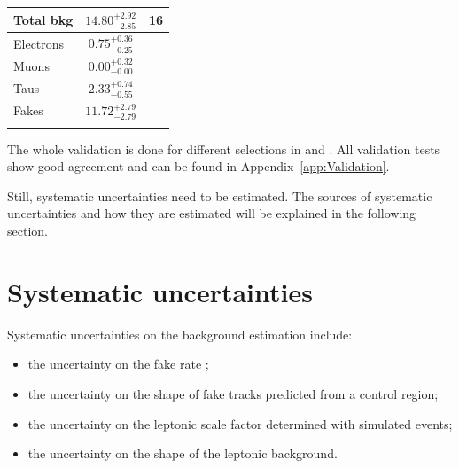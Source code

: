 \begin{table}[!b]
{\begin{tabular}{l|c |c}
\midrule
Total bkg                                                      &       $14.80^{ + 2.92}_{- 2.85}$            &  16        \\
\midrule
Electrons                                                      &       $0.75^{ + 0.36}_{ - 0.25}$            &                \\
Muons                                                          &       $0.00^{ + 0.32}_{- 0.00}$            &            \\
Taus                                                           &       $2.33^{ + 0.74}_{- 0.55}$            &          \\
Fakes                                                          &       $11.72^{ + 2.79}_{- 2.79}$            &          \\
\bottomrule
\multicolumn{3}{c}{} \\
\end{tabular}}
\end{table}


The whole validation is done for different selections in \pt and \ias.
All validation tests show good agreement and can be found in Appendix~\ref{app:Validation}.

Still, systematic uncertainties need to be estimated.
The sources of systematic uncertainties and how they are estimated will be explained in the following section.

\section{Systematic uncertainties}
\label{sec:SysUncertaintiesBkg}

Systematic uncertainties on the background estimation include:
\begin{itemize}
\item the uncertainty on the fake rate \fakerate;
\item the uncertainty on the \ias shape of fake tracks predicted from a control region;
\item the uncertainty on the leptonic scale factor \leptonscalefactor determined with simulated events;
\item the uncertainty on the \ias shape of the leptonic background.
\end{itemize}


